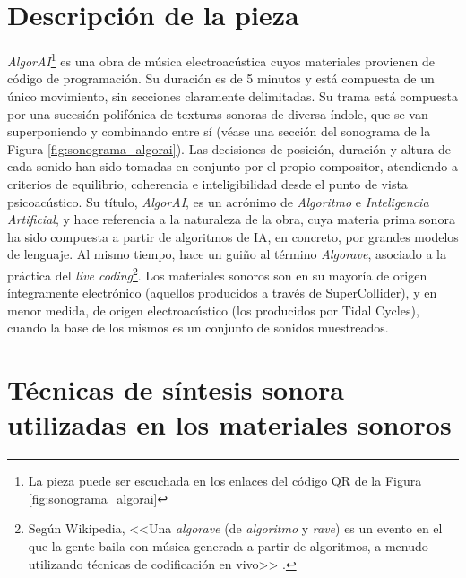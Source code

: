\section{Descripción de la pieza}

\emph{AlgorAI}\footnote{La pieza puede ser escuchada en los enlaces del código QR de la Figura \ref{fig:sonograma_algorai}} es una obra de música electroacústica cuyos materiales provienen de código de programación. Su duración es de 5 minutos y está compuesta de un único movimiento, sin secciones claramente delimitadas. Su trama está compuesta por una sucesión polifónica de texturas sonoras de diversa índole, que se van superponiendo y combinando entre sí (véase una sección del sonograma de la Figura \ref{fig:sonograma_algorai}). Las decisiones de posición, duración y altura de cada sonido han sido tomadas en conjunto por el propio compositor, atendiendo a criterios de equilibrio, coherencia e inteligibilidad desde el punto de vista psicoacústico. Su título, \emph{AlgorAI}, es un acrónimo de \emph{Algoritmo} e \emph{Inteligencia Artificial}, y hace referencia a la naturaleza de la obra, cuya materia prima sonora ha sido compuesta a partir de algoritmos de IA, en concreto, por grandes modelos de lenguaje. Al mismo tiempo, hace un guiño al término \emph{Algorave}, asociado a la práctica del \emph{live coding}\footnote{Según Wikipedia, <<Una \emph{algorave} (de \emph{algoritmo} y \emph{rave}) es un evento en el que la gente baila con música generada a partir de algoritmos, a menudo utilizando técnicas de codificación en vivo>> \citep{Algorave2023}.}.  Los materiales sonoros son en su mayoría de origen íntegramente electrónico (aquellos producidos a través de SuperCollider), y en menor medida, de origen electroacústico (los producidos por Tidal Cycles), cuando la base de los mismos es un conjunto de sonidos muestreados.


\section{Técnicas de síntesis sonora utilizadas en los materiales sonoros}

